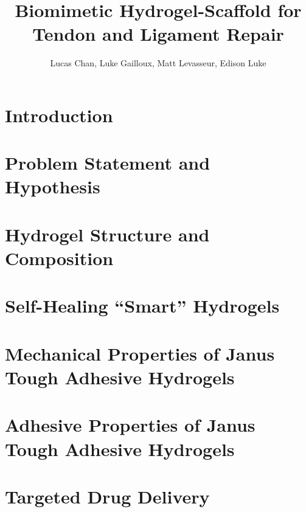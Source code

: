 \documentclass[
    letterpaper,
    10pt,
    unnumberedsections,
    twoside
]{LTJournalArticle}
\title{Biomimetic Hydrogel-Scaffold for Tendon and Ligament Repair}
\author{Lucas Chan, Luke Gailloux, Matt Levasseur, Edison Luke}
\begin{document}
    \maketitle 

    \section{Introduction}

    

    \section{Problem Statement and Hypothesis}

    

    \section{Hydrogel Structure and Composition}

    

    \section{Self-Healing ``Smart'' Hydrogels}

    

    

    \section{Mechanical Properties of Janus Tough Adhesive Hydrogels}

    

    \section{Adhesive Properties of Janus Tough Adhesive Hydrogels}

    

    \section{Targeted Drug Delivery}

    
\end{document}
